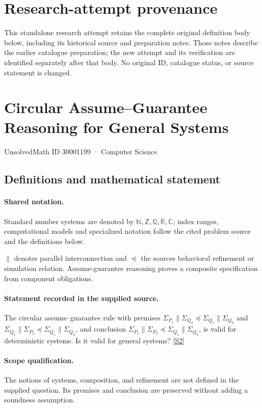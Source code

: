\documentclass[11pt]{article}
\begin{document}
\section*{Research-attempt provenance}
This standalone research attempt retains the complete original definition body below,
including its historical source and preparation notes. Those notes describe the
earlier catalogue preparation; the new attempt and its verification are identified
separately after that body. No original ID, catalogue status, or source statement is changed.

\section{Circular Assume–Guarantee Reasoning for General Systems}\label{30001199}
{\small UnsolvedMath ID 30001199 · Computer Science}
\subsection{Definitions and mathematical statement}

\paragraph{Shared notation.}Standard number systems are denoted by $\mathbb N,\mathbb Z,\mathbb Q,\mathbb R,\mathbb C$; index ranges, computational models and specialized notation follow the cited problem source and the definitions below.


$\parallel$ denotes parallel interconnection and $\preccurlyeq$ the source\textquotesingle s behavioral refinement or simulation relation. Assume-guarantee reasoning proves a composite specification from component obligations.
\paragraph{Statement recorded in the supplied source.}
The circular assume–guarantee rule with premises $\Sigma_{P_1}\parallel\Sigma_{Q_2}\preccurlyeq\Sigma_{Q_1}\parallel\Sigma_{Q_2}$ and $\Sigma_{Q_1}\parallel\Sigma_{P_2}\preccurlyeq\Sigma_{Q_1}\parallel\Sigma_{Q_2}$, and conclusion $\Sigma_{P_1}\parallel\Sigma_{P_2}\preccurlyeq\Sigma_{Q_1}\parallel\Sigma_{Q_2}$, is valid for deterministic systems. Is it valid for general systems? \href{https://doi.org/10.4171/owr/2009/11}{[S2]}
\paragraph{Scope qualification.}
The notions of systems, composition, and refinement are not defined in the supplied question. Its premises and conclusion are preserved without adding a soundness assumption.
\end{document}
